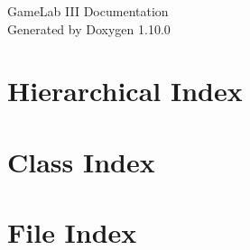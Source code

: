 \documentclass[twoside]{book}
\newcommand{\+}{\discretionary{\mbox{\scriptsize$\hookleftarrow$}}{}{}}
\newcommand{\clearemptydoublepage}{%
    \newpage{\pagestyle{empty}\cleardoublepage}%
  }
\begin{document}
  \raggedbottom
    \hypersetup{pageanchor=false,
                bookmarksnumbered=true,
                pdfencoding=unicode
               }
  \begin{titlepage}
  \vspace*{7cm}
  \begin{center}%
  {\Large Game\+Lab III Documentation}\\
  \vspace*{1cm}
  {\large Generated by Doxygen 1.10.0}\\
  \end{center}
  \end{titlepage}
  \clearemptydoublepage
  \tableofcontents
  \clearemptydoublepage
  \hypersetup{pageanchor=true}



\chapter{Hierarchical Index}

\chapter{Class Index}

\chapter{File Index}

\end{document}
